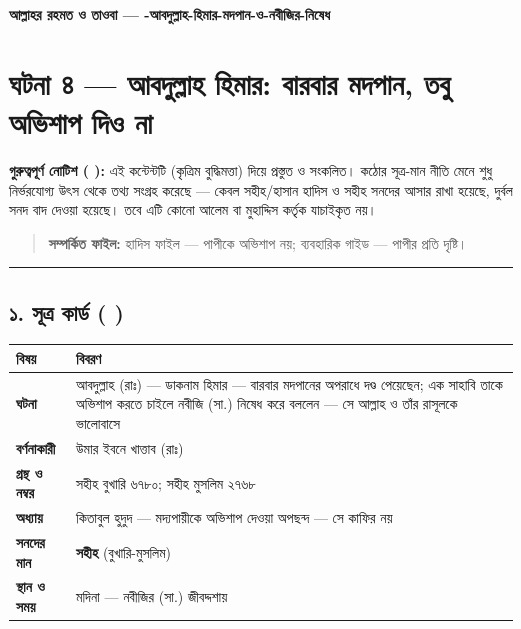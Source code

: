 

\begin{center}{\Large\bfseries\color{emerald} আল্লাহর রহমত ও তাওবা — -আবদুল্লাহ-হিমার-মদপান-ও-নবীজির-নিষেধ}\end{center}
\vspace{1em}
\section*{ঘটনা ৪ — আবদুল্লাহ হিমার: বারবার মদপান, তবু অভিশাপ দিও না}

\begin{warnbox}
 \textbf{গুরুত্বপূর্ণ নোটিশ ( ):} এই কন্টেন্টটি  (কৃত্রিম বুদ্ধিমত্তা) দিয়ে প্রস্তুত ও সংকলিত।  কঠোর সূত্র-মান নীতি মেনে শুধু নির্ভরযোগ্য উৎস থেকে তথ্য সংগ্রহ করেছে — কেবল সহীহ/হাসান হাদিস ও সহীহ সনদের আসার রাখা হয়েছে, দুর্বল সনদ বাদ দেওয়া হয়েছে। তবে এটি কোনো আলেম বা মুহাদ্দিস কর্তৃক যাচাইকৃত নয়।
\end{warnbox}

\begin{quote}
\textbf{সম্পর্কিত ফাইল:} হাদিস ফাইল — পাপীকে অভিশাপ নয়; ব্যবহারিক গাইড — পাপীর প্রতি দৃষ্টি।
\end{quote}

\medskip\hrule\medskip

\subsection*{১. সূত্র কার্ড ( )}

\begin{table}[h]\centering\small
\begin{tabular}{ll}
বিষয় & বিবরণ \\
\hline
\textbf{ঘটনা} & আবদুল্লাহ (রাঃ) — ডাকনাম \lat{“}হিমার\lat{”} — বারবার মদপানের অপরাধে দণ্ড পেয়েছেন; এক সাহাবি তাকে অভিশাপ করতে চাইলে নবীজি (সা.) নিষেধ করে বললেন — সে আল্লাহ ও তাঁর রাসূলকে ভালোবাসে \\
\textbf{বর্ণনাকারী} & উমার ইবনে খাত্তাব (রাঃ) \\
\textbf{গ্রন্থ ও নম্বর} & সহীহ বুখারি ৬৭৮০; সহীহ মুসলিম ২৭৬৮ \\
\textbf{অধ্যায়} & কিতাবুল হুদুদ — \lat{“}মদ্যপায়ীকে অভিশাপ দেওয়া অপছন্দ — সে কাফির নয়\lat{”} \\
\textbf{সনদের মান} & \textbf{সহীহ} (বুখারি-মুসলিম) \\
\textbf{স্থান ও সময়} & মদিনা — নবীজির (সা.) জীবদ্দশায় \\
\hline
\end{tabular}
\end{table}

